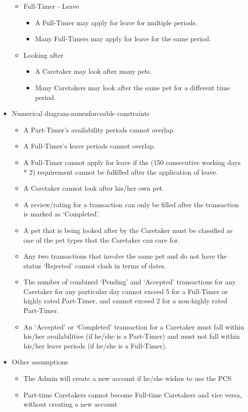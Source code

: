 \documentclass[10pt]{article}
\begin{document}
\begin{itemize}
\begin{itemize}
        \item Full-Timer - Leave
        \begin{itemize}
            \item A Full-Timer may apply for leave for multiple periods.
            \item Many Full-Timers may apply for leave for the same period.
	    \end{itemize}
        \item Looking after
        \begin{itemize}
            \item A Caretaker may look after many pets.
            \item Many Caretakers may look after the same pet for a different time period.
        \end{itemize}
    \end{itemize}
    
    \item Numerical diagram-nonenforceable constraints
    \begin{itemize}
        \item A Part-Timer's availability periods cannot overlap.
        \item A Full-Timer's leave periods cannot overlap.
        \item A Full-Timer cannot apply for leave if the (150 consecutive working days * 2) requirement cannot be fulfilled after the application of leave.
        \item A Caretaker cannot look after his/her own pet.
        \item A review/rating for a transaction can only be filled after the transaction is marked as `Completed'.
        \item A pet that is being looked after by the Caretaker must be classified as one of the pet types that the Caretaker can care for.
        \item Any two transactions that involve the same pet and do not have the status `Rejected' cannot clash in terms of dates.
        \item The number of combined `Pending' and `Accepted' transactions for any Caretaker for any particular day cannot exceed 5 for a Full-Timer or highly rated Part-Timer, and cannot exceed 2 for a non-highly rated Part-Timer.
        \item An `Accepted' or `Completed' transaction for a Caretaker must fall within his/her availabilities (if he/she is a Part-Timer) and must not fall within his/her leave periods (if he/she is a Full-Timer).
    \end{itemize}
    
    \item Other assumptions
    \begin{itemize}
        \item The Admin will create a new account if he/she wishes to use the PCS
        \item Part-time Caretakers cannot become Full-time Caretakers and vice versa, without creating a new account
    \end{itemize}
\end{itemize} %
\end{document}
